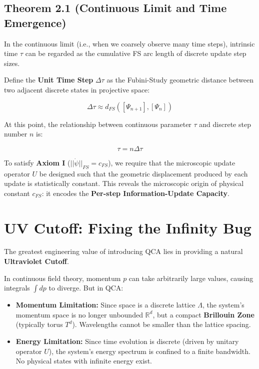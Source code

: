 \documentclass[11pt,a4paper,twoside]{book}
\begin{document}
\subsection{Theorem 2.1 (Continuous Limit and Time Emergence)}

In the continuous limit (i.e., when we coarsely observe many time steps), intrinsic time \textbf{$\tau$} can be regarded as the cumulative FS arc length of discrete update step sizes.

Define the \textbf{Unit Time Step} \textbf{$\Delta \tau$} as the Fubini-Study geometric distance between two adjacent discrete states in projective space:

$$\Delta \tau \approx d_{FS}([\Psi_{n+1}], [\Psi_n])$$

At this point, the relationship between continuous parameter \textbf{$\tau$} and discrete step number \textbf{$n$} is:

$$\tau = n \Delta \tau$$

To satisfy \textbf{Axiom I} (\textbf{$||\dot{\psi}||_{FS} = c_{FS}$}), we require that the microscopic update operator \textbf{$U$} be designed such that the geometric displacement produced by each update is statistically constant. This reveals the microscopic origin of physical constant \textbf{$c_{FS}$}: it encodes the \textbf{Per-step Information-Update Capacity}.

\section{UV Cutoff: Fixing the Infinity Bug}

The greatest engineering value of introducing QCA lies in providing a natural \textbf{Ultraviolet Cutoff}.

In continuous field theory, momentum \textbf{$p$} can take arbitrarily large values, causing integrals \textbf{$\int dp$} to diverge. But in QCA:

\begin{itemize}
\item \textbf{Momentum Limitation:} Since space is a discrete lattice \textbf{$\Lambda$}, the system's momentum space is no longer unbounded \textbf{$\mathbb{R}^d$}, but a compact \textbf{Brillouin Zone} (typically torus \textbf{$T^d$}). Wavelengths cannot be smaller than the lattice spacing.

\item \textbf{Energy Limitation:} Since time evolution is discrete (driven by unitary operator \textbf{$U$}), the system's energy spectrum is confined to a finite bandwidth. No physical states with infinite energy exist.
\end{itemize}
\end{document}
